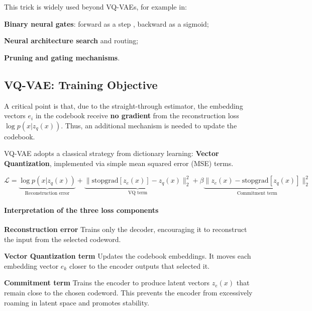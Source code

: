 This trick is widely used beyond VQ-VAEs, for example in:
\begin{compactitemize}
    \item \textbf{Binary neural gates}: forward as a step , backward as a  sigmoid;
    \item \textbf{Neural architecture search} and routing;
    \item \textbf{Pruning and gating mechanisms}.
\end{compactitemize}

\subsection{VQ-VAE: Training Objective}

A critical point is that, due to the straight-through estimator, the embedding vectors $e_i$ in the codebook receive \textbf{no gradient} from the reconstruction loss $\log p(x|z_q(x))$.  
Thus, an additional mechanism is needed to update the codebook.  

VQ-VAE adopts a classical strategy from dictionary learning: \textbf{Vector Quantization}, implemented via simple mean squared error (MSE) terms.

\[
    \mathcal{L} =
    \underbrace{\log p(x|z_q(x))}_{\text{Reconstruction error}}
    +
    \underbrace{\| \text{stopgrad}[z_e(x)] - z_q(x) \|_2^2}_{\text{VQ term}}
    +
    \beta \underbrace{\| z_e(x) - \text{stopgrad}[z_q(x)] \|_2^2}_{\text{Commitment term}}
\]

\paragraph{Interpretation of the three loss components}
\begin{compactitemize}
    \item \textbf{Reconstruction error}  
    Trains only the decoder, encouraging it to reconstruct the input from the selected codeword.

    \item \textbf{Vector Quantization term}  
    Updates the codebook embeddings.  
    It moves each embedding vector $e_k$ closer to the encoder outputs that selected it.

    \item \textbf{Commitment term}  
    Trains the encoder to produce latent vectors $z_e(x)$ that remain close to the chosen codeword.  
    This prevents the encoder from excessively roaming in latent space and promotes stability.
\end{compactitemize}

